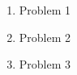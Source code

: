 \documentclass{article}
\begin{document}
\begin{enumerate}
  \item {Problem 1}
  \item {Problem 2}
  \item {Problem 3}
\end{enumerate}
\end{document}
